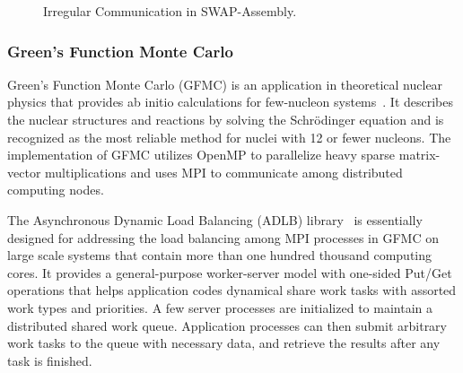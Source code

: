\begin{figure}[ht]
\centering
{}
\caption{Irregular Communication in SWAP-Assembly.}
\label{fig:app-swap}
\end{figure}


\subsubsection{Green’s Function Monte Carlo}
Green’s Function Monte Carlo (GFMC) is an application in theoretical nuclear
physics that provides ab initio calculations for few-nucleon systems~\cite{gfmc}.
It describes the nuclear structures and reactions by solving the
Schr\"{o}dinger equation and is recognized as the most reliable method
for nuclei with 12 or fewer nucleons. The implementation of GFMC utilizes
OpenMP to parallelize heavy sparse matrix-vector multiplications and
uses MPI to communicate among distributed computing nodes.

The Asynchronous Dynamic Load Balancing (ADLB) library~\cite{adlb} is
essentially designed for addressing the load balancing among MPI processes
in GFMC on large scale systems that contain more than one hundred thousand
computing cores. It provides a general-purpose worker-server model with
one-sided Put/Get operations that helps application codes dynamical
share work tasks with assorted work types and priorities. A few server
processes are initialized to maintain a distributed shared work queue.
Application processes can then submit arbitrary work tasks to the queue
with necessary data, and retrieve the results after any task is finished.
